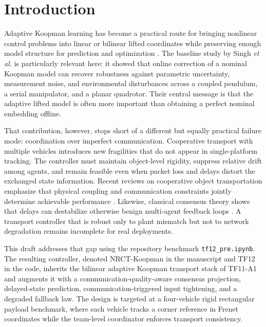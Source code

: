 \documentclass[twocolumn,3p,times,procedia]{elsarticle}
\newcommand{\methodname}{NRCT-Koopman}
\newcommand{\tfone}{TF11-A1}
\newcommand{\tftwo}{TF12}
\begin{document}
\section{Introduction}
Adaptive Koopman learning has become a practical route for bringing nonlinear control problems into linear or bilinear lifted coordinates while preserving enough model structure for prediction and optimization \cite{singh2024adaptive,bruder2021advantages,folkestad2021koopman}. The baseline study by Singh \emph{et al.} \cite{singh2024adaptive} is particularly relevant here: it showed that online correction of a nominal Koopman model can recover robustness against parametric uncertainty, measurement noise, and environmental disturbances across a coupled pendulum, a serial manipulator, and a planar quadrotor. Their central message is that the adaptive lifted model is often more important than obtaining a perfect nominal embedding offline.

That contribution, however, stops short of a different but equally practical failure mode: coordination over imperfect communication. Cooperative transport with multiple vehicles introduces new fragilities that do not appear in single-platform tracking. The controller must maintain object-level rigidity, suppress relative drift among agents, and remain feasible even when packet loss and delays distort the exchanged state information. Recent reviews on cooperative object transportation emphasize that physical coupling and communication constraints jointly determine achievable performance \cite{ebel2024cooperative}. Likewise, classical consensus theory shows that delays can destabilize otherwise benign multi-agent feedback loops \cite{olfatisaber2004consensus}. A transport controller that is robust only to plant mismatch but not to network degradation remains incomplete for real deployments.

This draft addresses that gap using the repository benchmark \texttt{tf12\_pre.ipynb}. The resulting controller, denoted \methodname{} in the manuscript and \tftwo{} in the code, inherits the bilinear adaptive Koopman transport stack of \tfone{} and augments it with a communication-quality-aware consensus projection, delayed-state prediction, communication-triggered input tightening, and a degraded fallback law. The design is targeted at a four-vehicle rigid rectangular payload benchmark, where each vehicle tracks a corner reference in Frenet coordinates while the team-level coordinator enforces transport consistency.
\end{document}
